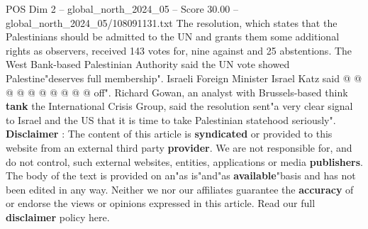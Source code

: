 \begin{textsample}{POS Dim 2 – global\_north\_2024\_05 – Score 30.00 – global\_north\_2024\_05/108091131.txt}
The resolution, which states that the Palestinians should be admitted to the UN and grants them some additional rights as observers, received 143 votes for, nine against and 25 abstentions.
The West Bank-based Palestinian Authority said the UN vote showed Palestine"deserves full membership".
Israeli Foreign Minister Israel Katz said @ @ @ @ @ @ @ @ @ @ off".
Richard Gowan, an analyst with Brussels-based think \textbf{tank} the International Crisis Group, said the resolution sent"a very clear signal to Israel and the US that it is time to take Palestinian statehood seriously". \textbf{Disclaimer} : The content of this article is \textbf{syndicated} or provided to this website from an external third party \textbf{provider}.
We are not responsible for, and do not control, such external websites, entities, applications or media \textbf{publishers}.
The body of the text is provided on an"as is"and"as \textbf{available}"basis and has not been edited in any way.
Neither we nor our affiliates guarantee the \textbf{accuracy} of or endorse the views or opinions expressed in this article.
Read our full \textbf{disclaimer} policy here.

\end{textsample}
